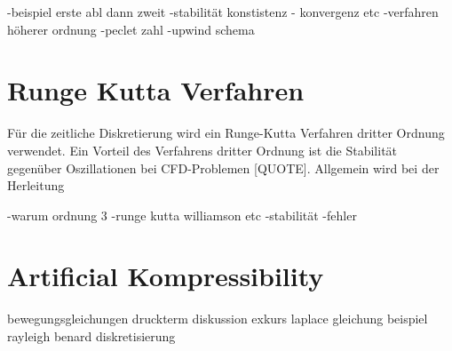 -beispiel erste abl dann zweit
-stabilität konstistenz - konvergenz etc
-verfahren höherer ordnung
-peclet zahl
-upwind schema


\section{Runge Kutta Verfahren}
Für die zeitliche Diskretierung wird ein Runge-Kutta Verfahren dritter Ordnung verwendet.
Ein Vorteil des Verfahrens dritter Ordnung ist die Stabilität gegenüber Oszillationen bei CFD-Problemen [QUOTE].
Allgemein wird bei der Herleitung

-warum ordnung 3
-runge kutta williamson etc
-stabilität
-fehler

\newpage

\section{Artificial Kompressibility}
bewegungsgleichungen
druckterm diskussion
exkurs laplace gleichung
beispiel rayleigh benard diskretisierung

